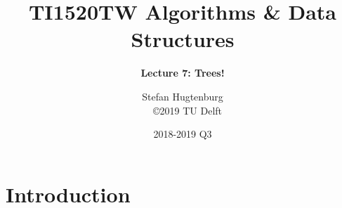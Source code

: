 

\title[Algorithms \& Data Structures]{TI1520TW Algorithms \& Data Structures}
\subtitle{\color{cyan} \textbf{Lecture 7: Trees!}}
\author{Stefan Hugtenburg\\ {\tiny{\qquad~~\copyright 2019 TU Delft}}}
\date{2018-2019 Q3}



\frame{\titlepage}

\section{Introduction}













\frame{\titlepage}


